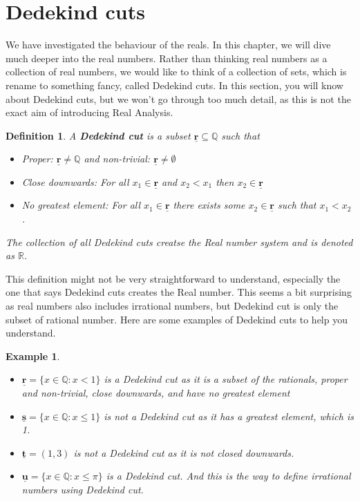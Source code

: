 \documentclass{book}
\newtheorem{definition}[theorem]{Definition}
\newtheorem{example}[theorem]{Example}
\begin{document}
\section{Dedekind cuts}

We have investigated the behaviour of the reals. In this chapter, we will dive much deeper into the real numbers. Rather than thinking real numbers as a collection of real numbers, we would like to think of a collection of sets, which is rename to something fancy, called Dedekind cuts. In this section, you will know about Dedekind cuts, but we won't go through too much detail, as this is not the exact aim of introducing Real Analysis.

\begin{definition}
    A \textbf{Dedekind cut} is a subset $\underline{\mathbf{r}} \subseteq \mathbb{Q}$ such that
    \begin{itemize}[itemsep = 0pt]
        \item Proper: $\underline{\mathbf{r}} \neq \mathbb{Q}$ and non-trivial: $\underline{\mathbf{r}} \neq \emptyset$
        \item Close downwards: For all $x_{1} \in \underline{\mathbf{r}}$ and $x_{2} < x_{1}$ then $x_{2} \in \underline{\mathbf{r}}$
        \item No greatest element: For all $x_{1} \in \underline{\mathbf{r}}$ there exists some $x_{2} \in \underline{\mathbf{r}}$ such that $x_{1} < x_{2}$.
    \end{itemize}
    The collection of all Dedekind cuts creatse the Real number system and is denoted as $\mathbb{R}$.
\end{definition}

This definition might not be very straightforward to understand, especially the one that says Dedekind cuts creates the Real number. This seems a bit surprising as real numbers also includes irrational numbers, but Dedekind cut is only the subset of rational number. Here are some examples of Dedekind cuts to help you understand.

\begin{example}
    \begin{itemize}
        \item[(1)] $\underline{\mathbf{r}} = \{ x \in \mathbb{Q} : x < 1 \}$ is a Dedekind cut as it is a subset of the rationals, proper and non-trivial, close downwards, and have no greatest element
        \item[(2)] $\underline{\mathbf{s}} = \{ x \in \mathbb{Q} : x \leq 1 \}$ is not a Dedekind cut as it has a greatest element, which is 1.
        \item[(3)] $\underline{\mathbf{t}} = (1, 3)$ is not a Dedekind cut as it is not closed downwards.
        \item[(4)] $\underline{\mathbf{u}} = \{ x \in \mathbb{Q} : x \leq \pi \}$ is a Dedekind cut. And this is the way to define irrational numbers using Dedekind cut.
    \end{itemize}
\end{example}
\end{document}
